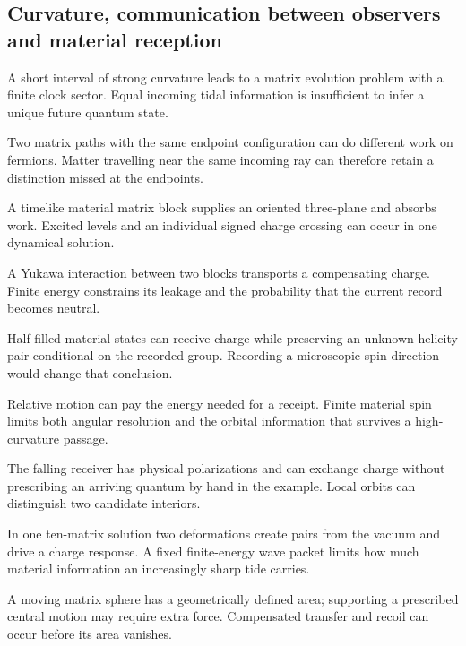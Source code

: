 \subsection{Curvature, communication between observers and material reception}
\begin{description}\small
\setlength{\itemsep}{.25em}\setlength{\parskip}{0pt}
\item[\textnormal{\texttt{RES-0152}}] A short interval of strong curvature leads to a matrix evolution problem with a finite clock sector. Equal incoming tidal information is insufficient to infer a unique future quantum state.
\item[\textnormal{\texttt{RES-0153}}] Two matrix paths with the same endpoint configuration can do different work on fermions. Matter travelling near the same incoming ray can therefore retain a distinction missed at the endpoints.
\item[\textnormal{\texttt{RES-0154}}] A timelike material matrix block supplies an oriented three-plane and absorbs work. Excited levels and an individual signed charge crossing can occur in one dynamical solution.
\item[\textnormal{\texttt{RES-0155}}] A Yukawa interaction between two blocks transports a compensating charge. Finite energy constrains its leakage and the probability that the current record becomes neutral.
\item[\textnormal{\texttt{RES-0156}}] Half-filled material states can receive charge while preserving an unknown helicity pair conditional on the recorded group. Recording a microscopic spin direction would change that conclusion.
\item[\textnormal{\texttt{RES-0157}}] Relative motion can pay the energy needed for a receipt. Finite material spin limits both angular resolution and the orbital information that survives a high-curvature passage.
\item[\textnormal{\texttt{RES-0158}}] The falling receiver has physical polarizations and can exchange charge without prescribing an arriving quantum by hand in the example. Local orbits can distinguish two candidate interiors.
\item[\textnormal{\texttt{RES-0159}}] In one ten-matrix solution two deformations create pairs from the vacuum and drive a charge response. A fixed finite-energy wave packet limits how much material information an increasingly sharp tide carries.
\item[\textnormal{\texttt{RES-0160}}] A moving matrix sphere has a geometrically defined area; supporting a prescribed central motion may require extra force. Compensated transfer and recoil can occur before its area vanishes.

\end{description}
